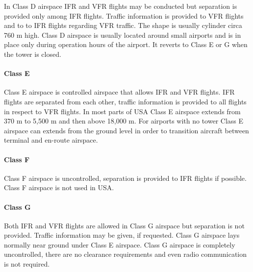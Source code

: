 In Class D airspace IFR and VFR flights may be conducted but separation is provided only among IFR flights. Traffic information is provided to VFR flights and to to IFR flights regarding VFR traffic. The shape is usually cylinder circa 760 m high. Class D airspace is usually located around small airports and is in place only during operation hours of the airport. It reverts to Class E or G when the tower is closed.

\paragraph{Class E}

Class E airspace is controlled airspace that allows IFR and VFR flights. IFR flights are separated from each other, traffic information is provided to all flights in respect to VFR flights. In most parts of USA Class E airspace extends from 370 m to 5,500 m and then above 18,000 m. For airports with no tower Class E airspace can extends from the ground level in order to transition aircraft between terminal and en-route airspace. \cite{nolan}

\paragraph{Class F}

Class F airspace is uncontrolled, separation is provided to IFR flights if possible. Class F airspace is not used in USA.

\paragraph{Class G}

Both IFR and VFR flights are allowed in Class G airspace but separation is not provided. Traffic information may be given, if requested. Class G airspace lays normally near ground under Class E airspace. Class G airspace is completely uncontrolled, there are no clearance requirements and even radio communication is not required.





